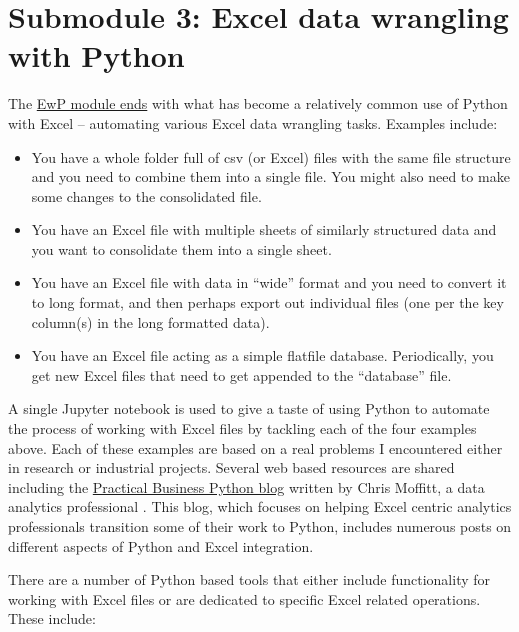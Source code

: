 \documentclass[ited,blindrev]{informs3}              %
\begin{document}
\section{Submodule 3: Excel data wrangling with Python}

The \href{http://www.sba.oakland.edu/faculty/isken/courses/mis6900/mod3c_python_excel.html}{EwP module ends} with what has become a relatively common use of Python with Excel -- automating various Excel data wrangling tasks. Examples include:

\begin{itemize}
	\item
	You have a whole folder full of csv (or Excel) files with the same
	file structure and you need to combine them into a single file. You
	might also need to make some changes to the consolidated file.
	\item
	You have an Excel file with multiple sheets of similarly structured
	data and you want to consolidate them into a single sheet.
	\item
	You have an Excel file with data in ``wide'' format and you need to
	convert it to long format, and then perhaps export out individual
	files (one per the key column(s) in the long formatted data).
	\item
	You have an Excel file acting as a simple flatfile database.
	Periodically, you get new Excel files that need to get appended to the
	``database'' file.
\end{itemize}

A single Jupyter notebook is used to give a taste of using Python to automate the process of working with Excel files by tackling each of the four examples above. Each of these examples are based on a real problems I encountered either in research or industrial projects. Several web based resources are shared including the \href{https://pbpython.com/}{Practical Business Python blog} written by Chris Moffitt, a data analytics professional \cite{moffittPracticalBusinessPython}. This blog, which focuses on helping Excel centric analytics professionals transition some of their work to Python, includes numerous posts on different aspects of Python and Excel integration.  

There are a number of Python based tools that either include functionality for working with Excel files or are dedicated to specific Excel related operations. These include:
\end{document}
